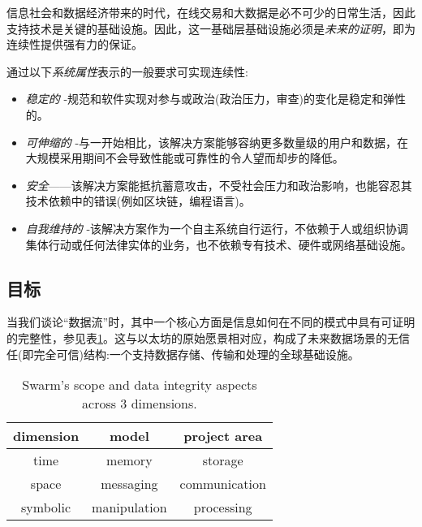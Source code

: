信息社会和数据经济带来的时代，在线交易和大数据是必不可少的日常生活，因此支持技术是关键的基础设施。因此，这一基础层基础设施必须是\emph{未来的证明}，即为连续性提供强有力的保证。 

通过以下\emph{系统属性}表示的一般要求可实现连续性:

\begin{itemize}
\item \emph{稳定的} -规范和软件实现对参与或政治(政治压力，审查)的变化是稳定和弹性的。
\item \emph{可伸缩的} -与一开始相比，该解决方案能够容纳更多数量级的用户和数据，在大规模采用期间不会导致性能或可靠性的令人望而却步的降低。  
\item \emph{安全}——该解决方案能抵抗蓄意攻击，不受社会压力和政治影响，也能容忍其技术依赖中的错误(例如区块链，编程语言)。 
\item \emph{自我维持的} -该解决方案作为一个自主系统自行运行，不依赖于人或组织协调集体行动或任何法律实体的业务，也不依赖专有技术、硬件或网络基础设施。 
\end{itemize}




\subsection{目标\statusyellow}\label{sec:objectives}


当我们谈论“数据流”时，其中一个核心方面是信息如何在不同的模式中具有可证明的完整性，参见表\ref{tab:scope}。这与以太坊的原始愿景相对应，构成了未来数据场景的无信任(即完全可信)结构:一个支持数据存储、传输和处理的全球基础设施。

\begin{table}[htb]
\centering
\begin{tabular}{c|c|c}
dimension & model & project area\\\hline
%
time & memory & storage \\
space & messaging & communication \\
symbolic & manipulation & processing \\
\end{tabular}
\caption{Swarm's scope and data integrity aspects across 3 dimensions.}
\label{tab:scope}
\end{table}

